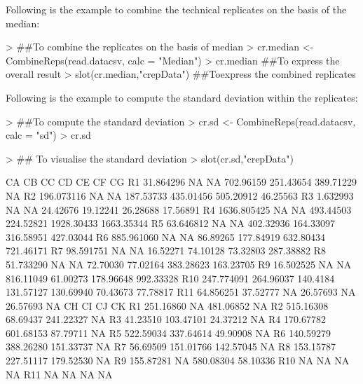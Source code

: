 \documentclass[11pt]{article}
\begin{document}
Following is the example to combine the technical replicates on the basis of the median:
\begin{Schunk}
\begin{Sinput}
> ##To combine the replicates on the basis of median
> cr.median <- CombineReps(read.datacsv, calc = "Median")
> cr.median ##To express the overall result
> slot(cr.median,"crepData") ##Toexpress the combined replicates
\end{Sinput}
\end{Schunk}

Following is the example to compute the standard deviation within the replicates:
\begin{Schunk}
\begin{Sinput}
> ##To compute the standard deviation
> cr.sd <- CombineReps(read.datacsv, calc = "sd")
> cr.sd
\end{Sinput}
\end{Schunk}

\begin{Schunk}
\begin{Sinput}
> ## To visualise the standard deviation
> slot(cr.sd,"crepData")
\end{Sinput}
\begin{Soutput}
             CA        CB       CC        CD        CE         CF         CG
R1    31.864296        NA       NA 702.96159 251.43654  389.71229         NA
R2   196.073116        NA       NA 187.53733 435.01456  505.20912   46.25563
R3     1.632993        NA       NA  24.42676  19.12241   26.28688   17.56891
R4  1636.805425        NA       NA 493.44503 224.52821 1928.30433 1663.35344
R5    63.646812        NA       NA 402.32936 164.33097  316.58951  427.03044
R6   885.961060        NA       NA  86.89265 177.84919  632.80434  721.46171
R7    98.591751        NA       NA  16.52271  74.10128   73.32803  287.38882
R8    51.733290        NA       NA  72.70030  77.02164  383.28623  163.23705
R9    16.502525        NA       NA 816.11049  61.00273  178.96648  992.33328
R10  247.774091 264.96037 140.4184 131.57127 130.69940   70.43673   77.78817
R11   64.856251  37.52777       NA  26.57693        NA   26.57693         NA
           CH        CI        CJ       CK
R1  251.16860        NA 481.06852       NA
R2  515.16308  68.69437 241.22327       NA
R3   41.23510 103.47101  24.37212       NA
R4  170.67782 601.68153  87.79711       NA
R5  522.59034 337.64614  49.90908       NA
R6  140.59279 388.26280 151.33737       NA
R7   56.69509 151.01766 142.57045       NA
R8  153.15787 227.51117 179.52530       NA
R9  155.87281        NA 580.08304 58.10336
R10        NA        NA        NA       NA
R11        NA        NA        NA       NA
\end{Soutput}
\end{Schunk}
\end{document}
